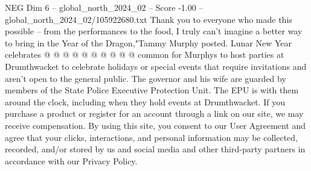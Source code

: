 \begin{textsample}{NEG Dim 6 – global\_north\_2024\_02 – Score -1.00 – global\_north\_2024\_02/105922680.txt}
Thank you to everyone who made this possible -- from the performances to the food, I truly can't imagine a better way to bring in the Year of the Dragon,"Tammy Murphy posted.
Lunar New Year celebrates @ @ @ @ @ @ @ @ @ @ common for Murphys to host parties at Drumthwacket to celebrate holidays or special events that require invitations and aren't open to the general public.
The governor and his wife are guarded by members of the State Police Executive Protection Unit.
The EPU is with them around the clock, including when they hold events at Drumthwacket.
If you purchase a product or register for an account through a link on our site, we may receive compensation.
By using this site, you consent to our User Agreement and agree that your clicks, interactions, and personal information may be collected, recorded, and/or stored by us and social media and other third-party partners in accordance with our Privacy Policy.

\end{textsample}
